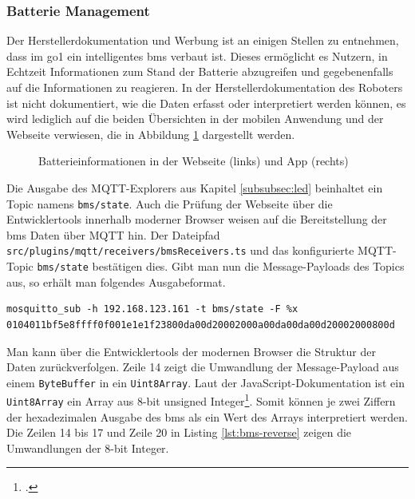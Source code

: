 \subsubsection{Batterie Management}

Der Herstellerdokumentation und Werbung ist an einigen Stellen zu entnehmen, dass im \gls{go1} ein intelligentes \gls{bms} verbaut ist.
Dieses ermöglicht es Nutzern, in Echtzeit Informationen zum Stand der Batterie abzugreifen und gegebenenfalls auf die Informationen
zu reagieren.
In der Herstellerdokumentation des Roboters ist nicht dokumentiert, wie die Daten erfasst oder interpretiert werden können,
es wird lediglich auf die beiden Übersichten in der mobilen Anwendung und der Webseite verwiesen, die in Abbildung \ref{fig:bms-app-web}
dargestellt werden.

\begin{figure}[h]
    \caption{Batterieinformationen in der Webseite (links) und App (rechts)}\label{fig:bms-app-web}
\end{figure}

Die Ausgabe des MQTT-Explorers aus Kapitel \ref{subsubsec:led} beinhaltet ein Topic namens \texttt{bms/\allowbreak state}.
Auch die Prüfung der Webseite über die Entwicklertools innerhalb moderner Browser weisen auf die Bereitstellung der
\gls{bms} Daten über MQTT hin.
Der Dateipfad \texttt{src/\allowbreak plugins/\allowbreak mqtt/\allowbreak receivers/\allowbreak bms\allowbreak Receivers\allowbreak .ts}
und das konfigurierte MQTT-Topic \texttt{bms\allowbreak /state} bestätigen dies.
Gibt man nun die Message-Payloads des Topics aus, so erhält man folgendes Ausgabeformat.

\begin{lstlisting}
mosquitto_sub -h 192.168.123.161 -t bms/state -F %x
0104011bf5e8ffff0f001e1e1f23800da00d20002000a00da00da00d20002000800d
\end{lstlisting}

Man kann über die Entwicklertools der modernen Browser die Struktur der Daten zurückverfolgen.
Zeile \num{14} zeigt die Umwandlung der Message-Payload aus einem \texttt{Byte\allowbreak Buffer} in ein \texttt{Uint8Array}.
Laut der JavaScript-Dokumentation ist ein \texttt{Uint8Array} ein Array aus \num{8}-bit unsigned Integer\footcite{uint8array}.
Somit können je zwei Ziffern der hexadezimalen Ausgabe des \gls{bms} als ein Wert des Arrays interpretiert werden.
Die Zeilen \num{14} bis \num{17} und Zeile \num{20} in Listing \ref{lst:bms-reverse} zeigen die Umwandlungen der \num{8}-bit Integer.

